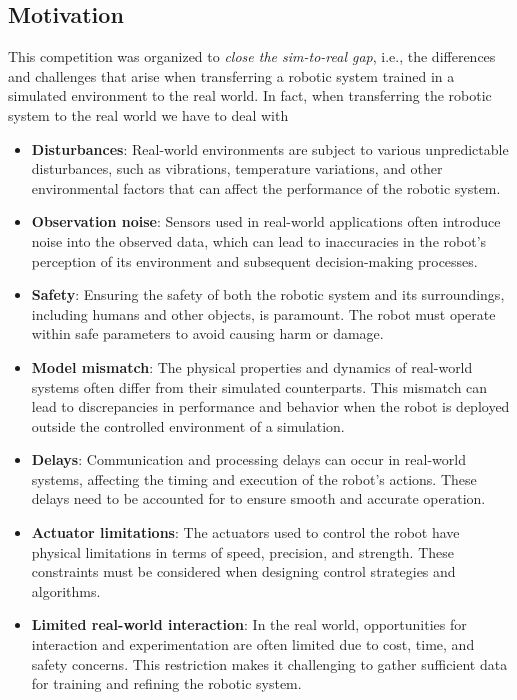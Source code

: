 
\subsection{Motivation}
This competition was organized to \textit{close the sim-to-real gap}, i.e., the differences and challenges that arise
when transferring a robotic system trained in a simulated environment to the real world.
In fact, when transferring the robotic system to the real world we have to deal with
\begin{itemize}
    \item \textbf{Disturbances}:
    Real-world environments are subject to various unpredictable disturbances, such as vibrations, 
    temperature variations, and other environmental factors that can affect the performance of the robotic system.
    \item \textbf{Observation noise}:
    Sensors used in real-world applications often introduce noise into the observed data, 
    which can lead to inaccuracies in the robot's perception of its environment and subsequent decision-making processes.
    \item \textbf{Safety}:
    Ensuring the safety of both the robotic system and its surroundings, including humans and other objects, is paramount. 
    The robot must operate within safe parameters to avoid causing harm or damage.
    \item \textbf{Model mismatch}:
    The physical properties and dynamics of real-world systems often differ from their simulated counterparts. 
    This mismatch can lead to discrepancies in performance and behavior when the robot is deployed outside the controlled environment of a simulation.
    \item \textbf{Delays}:
    Communication and processing delays can occur in real-world systems, affecting the timing and execution of the robot's actions. 
    These delays need to be accounted for to ensure smooth and accurate operation.
    \item \textbf{Actuator limitations}:
    The actuators used to control the robot have physical limitations in terms of speed, precision, and strength. 
    These constraints must be considered when designing control strategies and algorithms.
    \item \textbf{Limited real-world interaction}:
    In the real world, opportunities for interaction and experimentation are often limited due to cost, time, and safety concerns. 
    This restriction makes it challenging to gather sufficient data for training and refining the robotic system.
\end{itemize}

